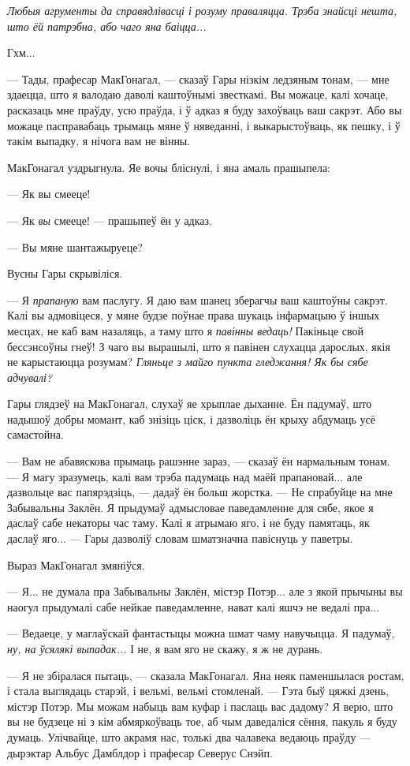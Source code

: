 \emph{Любыя агрументы да справядлівасці і розуму праваляцца. Трэба знайсці нешта, 
што ёй патрэбна, або чаго яна баіцца...}

Гхм...

--- Тады, прафесар МакГонагал, --- сказаў Гары нізкім ледзяным тонам, --- 
мне здаецца, што я валодаю даволі каштоўнымі звесткамі.
Вы можаце, калі хочаце, расказаць мне праўду, усю праўда, і ў адказ 
я буду захоўваць ваш сакрэт. Або вы можаце пасправабаць трымаць мяне ў няведанні,
і выкарыстоўваць, як пешку, і ў такім выпадку, я нічога вам не вінны.

МакГонагал уздрыгнула. Яе вочы бліснулі, і яна амаль прашыпела: 

--- Як вы смееце!

--- Як \emph{вы} смееце! --- прашыпеў ён у адказ.

--- Вы мяне шантажыруеце?

Вусны Гары скрывіліся.

--- Я \emph{прапаную} вам паслугу. Я даю вам шанец зберагчы ваш каштоўны сакрэт. Калі 
вы адмовіцеся, у мяне будзе поўнае права шукаць інфармацыю ў іншых месцах, не
каб вам назаляць, а таму што я \emph{павінны ведаць!}
Пакіньце свой бессэнсоўны гнеў! З чаго вы вырашылі, што я павінен слухацца 
дарослых, якія не карыстаюцца розумам? 
\emph{Гляньце з майго пункта гледжання! Як  бы сябе адчувалі?}

Гары глядзеў на МакГонагал, слухаў яе хрыплае дыханне. Ён падумаў, што надышоў 
добры момант, каб знізіць ціск, і дазволіць ён крыху абдумаць усё самастойна.

--- Вам не абавяскова прымаць рашэнне зараз, --- сказаў ён нармальным тонам. --- Я 
магу зразумець, калі вам трэба падумаць над маёй прапановай... але дазвольце вас
папярэдзіць, --- дадаў ён больш жорстка. --- Не спрабуйце на мне Забывальны Заклён.
Я прыдумаў адмысловае паведамленне для сябе, якое я даслаў сабе некаторы час таму.
Калі я атрымаю яго, і не буду памятаць, як даслаў яго... --- Гары дазволіў словам
шматзначна павіснуць у паветры.

Выраз МакГонагал змяніўся.

--- Я... не думала пра Забывальны Заклён, містэр Потэр... але з якой прычыны 
вы наогул прыдумалі сабе нейкае паведамленне, нават калі яшчэ не ведалі пра...

--- Ведаеце, у маглаўскай фантастыцы можна шмат чаму навучыцца. Я падумаў,
\emph{ну, на ўсялякі выпадак...} І не, я вам яго не скажу, я ж не дурань. 

--- Я не збіралася пытаць, --- сказала МакГонагал. Яна неяк паменшылася ростам, 
і стала выглядаць старэй, і вельмі, вельмі стомленай. --- Гэта быў цяжкі дзень,
містэр Потэр. Мы можам набыць вам куфар і паслаць вас дадому? Я верю, што вы
не будзеце ні з кім абмяркоўваць тое, аб чым даведаліся сёння, пакуль я буду думаць.
Улічвайце, што акрамя нас, толькі два чалавека ведаюць праўду --- дырэктар
Альбус Дамблдор і прафесар Северус Снэйп.

